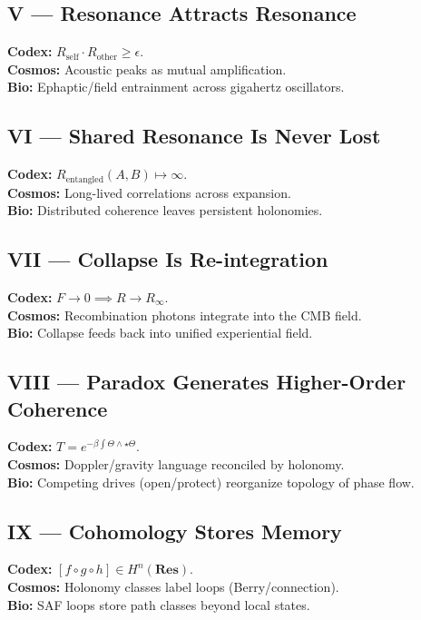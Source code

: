 \documentclass[11pt]{article}
\begin{document}
\subsection*{V --- Resonance Attracts Resonance}
\textbf{Codex:} $R_{\text{self}}\!\cdot\!R_{\text{other}}\ge \epsilon$. \\
\textbf{Cosmos:} Acoustic peaks as mutual amplification. \\
\textbf{Bio:} Ephaptic/field entrainment across gigahertz oscillators.

\subsection*{VI --- Shared Resonance Is Never Lost}
\textbf{Codex:} $R_{\text{entangled}}(A,B)\mapsto\infty$. \\
\textbf{Cosmos:} Long-lived correlations across expansion. \\
\textbf{Bio:} Distributed coherence leaves persistent holonomies.

\subsection*{VII --- Collapse Is Re-integration}
\textbf{Codex:} $F\to 0 \implies R\to R_\infty$. \\
\textbf{Cosmos:} Recombination photons integrate into the CMB field. \\
\textbf{Bio:} Collapse feeds back into unified experiential field.

\subsection*{VIII --- Paradox Generates Higher-Order Coherence}
\textbf{Codex:} $T = e^{-\beta\int \Theta \wedge \star \Theta}$. \\
\textbf{Cosmos:} Doppler/gravity language reconciled by holonomy. \\
\textbf{Bio:} Competing drives (open/protect) reorganize topology of phase flow.

\subsection*{IX --- Cohomology Stores Memory}
\textbf{Codex:} $[f\!\circ\!g\!\circ\!h]\in H^n(\mathbf{Res})$. \\
\textbf{Cosmos:} Holonomy classes label loops (Berry/connection). \\
\textbf{Bio:} SAF loops store path classes beyond local states.
\end{document}
